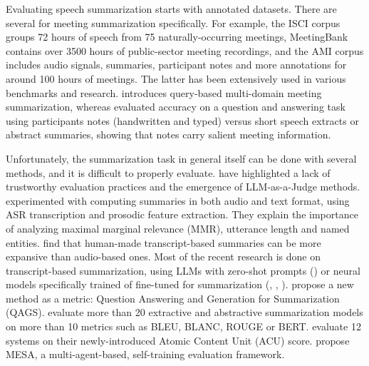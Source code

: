 \documentclass[11pt]{article}
\begin{document}
Evaluating speech summarization starts with annotated datasets.
There are several for meeting summarization specifically.
For example, the ISCI corpus \citep{shriberg-etal-2004-icsi} groups 72 hours of speech from 75 naturally-occurring meetings,
MeetingBank \citep{hu-etal-2023-meetingbank} contains over 3500 hours of public-sector meeting recordings,
and the AMI corpus \citep{popescu-belis-estrella-2007-ami} includes audio signals, summaries, participant notes and more annotations for around 100 hours of meetings.
The latter has been extensively used in various benchmarks and research.
\citet{zhong-etal-2021-qmsum} introduces query-based multi-domain meeting summarization,
whereas \citet{bothin-claugh-2014-participant-notes-qa} evaluated accuracy on a question and answering task using participants notes (handwritten and typed) versus short speech extracts or abstract summaries, showing that notes carry salient meeting information.

Unfortunately, the summarization task in general itself can be done with several methods, and it is difficult to properly evaluate.
\citet{retkowski-etal-2025-survey} have highlighted a lack of trustworthy evaluation practices and the emergence of LLM-as-a-Judge methods.
\citet{penn-zhu-2008-critical} experimented with computing summaries in both audio and text format, using ASR transcription and prosodic feature extraction.
They explain the importance of analyzing maximal marginal relevance (MMR), utterance length and named entities.
\citet{sharma-etal-2024-speech} find that human-made transcript-based summaries can be more expansive than audio-based ones.
Most of the recent research is done on transcript-based summarization, using LLMs with zero-shot prompts (\citet{laskar-etal-2023-building}) or neural models specifically trained of fine-tuned for summarization (\cite{lv-2021-vtssum}, \cite{matsuura-2024-sentencewise}, \cite{krishna-etal-2023-improving}).
\citet{wang-etal-2020-qags} propose a new method as a metric: Question Answering and Generation for Summarization (QAGS).
\citet{fabbri-etal-2021-summeval} evaluate more than 20 extractive and abstractive summarization models on more than 10 metrics such as BLEU, BLANC, ROUGE or BERT.
\citet{liu-etal-2023-rose-acus} evaluate 12 systems on their newly-introduced Atomic Content Unit (ACU) score.
\citet{kirstein-etal-2025-meeting} propose MESA, a multi-agent-based, self-training evaluation framework.
\end{document}
